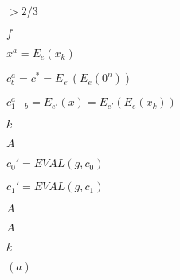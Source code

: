 \documentclass[10pt]{book}
\begin{document}
\begin{mdSnippets}
\begin{mdInlineSnippet}%
$> 2/3$\end{mdInlineSnippet}%
\begin{mdInlineSnippet}%
$f$\end{mdInlineSnippet}%
\begin{mdInlineSnippet}%
$x^a = E_e(x_k)$\end{mdInlineSnippet}%
\begin{mdInlineSnippet}[47057c30db514d73327ebfec872cf414]%
$c_b^a = c^* = E_{e'}(E_e(0^n))$\end{mdInlineSnippet}%
\begin{mdInlineSnippet}[cf775fd2c1162061b47ec380c267851d]%
$c_{1-b}^a = E_{e'}(x) = E_{e'}(E_e(x_k))$\end{mdInlineSnippet}%
\begin{mdInlineSnippet}[8ce4b16b22b58894aa86c421e8759df3]%
$k$\end{mdInlineSnippet}%
\begin{mdInlineSnippet}[7fc56270e7a70fa81a5935b72eacbe29]%
$A$\end{mdInlineSnippet}%
\begin{mdInlineSnippet}[d9ac39b456f62f6d231a454aee79005b]%
$c_0' = EVAL(g,c_0)$\end{mdInlineSnippet}%
\begin{mdInlineSnippet}[74c4681cba7fd4c8ed57526d8d4b2c22]%
$c_1' = EVAL(g,c_1)$\end{mdInlineSnippet}%
\begin{mdInlineSnippet}[7fc56270e7a70fa81a5935b72eacbe29]%
$A$\end{mdInlineSnippet}%
\begin{mdInlineSnippet}[7fc56270e7a70fa81a5935b72eacbe29]%
$A$\end{mdInlineSnippet}%
\begin{mdInlineSnippet}[8ce4b16b22b58894aa86c421e8759df3]%
$k$\end{mdInlineSnippet}%
\begin{mdInlineSnippet}[69dfdf4e6a7c8489262f9d8b9958c9b3]%
$(a)$\end{mdInlineSnippet}%

\end{mdSnippets}
\end{document}
